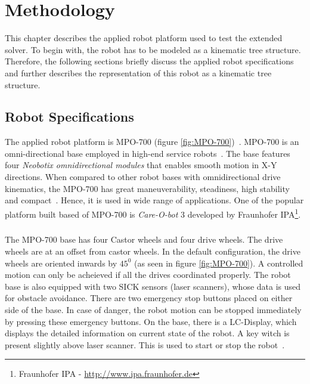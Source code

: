 
\chapter{Methodology} 
This chapter describes the applied robot platform used to test the extended solver. To begin with, the robot has to be modeled as a kinematic tree structure. Therefore, the following sections briefly discuss the applied robot specifications and further describes the representation of this robot as a kinematic tree structure. 




\section{Robot Specifications}
The applied robot platform is MPO-700 (figure \ref{fig:MPO-700})~\cite{MPO700}. MPO-700 is an omni-directional base employed in high-end service robots~\cite{Neobotix-homepage}. The base features four \textit{Neobotix omnidirectional modules} that enables smooth motion in X-Y directions. When compared to other robot bases with omnidirectional drive kinematics, the MPO-700 has great maneuverability, steadiness, high stability and compact~\cite{Neobotix-homepage}. Hence, it is used in wide range of applications. One of the popular platform built based of MPO-700 is \textit{Care-O-bot} 3 developed by Fraunhofer IPA\footnote{Fraunhofer IPA - \url{http://www.ipa.fraunhofer.de}}. 


\paragraph{}The MPO-700 base has four Castor wheels and four drive wheels. The drive wheels are at an offset from castor wheels. In the default configuration, the drive wheels are oriented inwards by $45^0$ (as seen in figure \ref{fig:MPO-700}). A controlled motion can only be acheieved if all the drives coordinated properly. The robot base is also equipped with two SICK sensors (laser scanners), whose data is used for obstacle avoidance. There are two emergency stop buttons placed on either side of the base. In case of danger, the robot motion can be stopped immediately by pressing these emergency buttons. On the base, there is a LC-Display, which displays the detailed information on current state of the robot. A key witch is present slightly above laser scanner. This is used to start or stop the robot~\cite{MPO700}.

